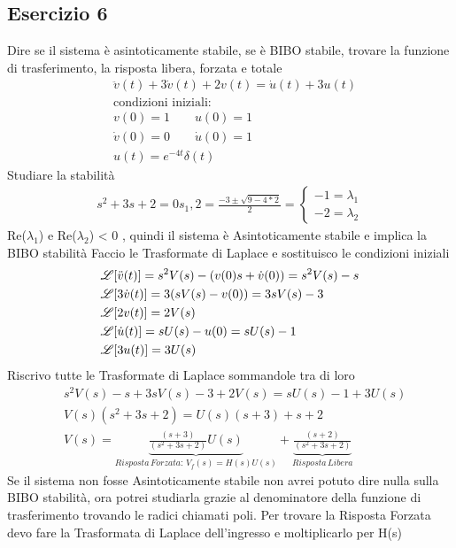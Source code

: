 	\subsection{Esercizio 6}
		Dire se il sistema è asintoticamente stabile, se è BIBO stabile, trovare la funzione di trasferimento, la risposta libera, forzata e totale
		\[
		\begin{split}
		&\ddot{v}(t)+3\dot{v}(t)+2v(t)=\dot{u}(t)+3u(t)\\
		&\mathrm{condizioni \,\, iniziali:}\\
		&v(0) = 1 \qquad u(0)=1\\
		&\dot{v}(0)=0 \qquad \dot{u}(0)=1\\
		&u(t)=e^{-4t}\delta(t)
		\end{split}
		\]
		Studiare la stabilità
		\[
		\begin{split}
		s^2+3s+2=0
		s_1,2=\frac{-3\pm\sqrt{9-4*2}}{2} = 
		\begin{cases}
		-1 = \lambda_1\\
		-2 = \lambda_2
		\end{cases} 
		\end{split}
		\]
		Re($\lambda_1$) e Re($\lambda_2$) < 0 , quindi il sistema è Asintoticamente stabile e implica la BIBO stabilità
		Faccio le Trasformate di Laplace e sostituisco le condizioni iniziali
		\[
		\begin{split}
		&\mathscr{L}[\ddot{v}(t)]=s^2V(s)-(v(0)s+\dot{v}(0)) = s^2V(s)-s\\
		&\mathscr{L}[3\dot{v}(t)]=3(sV(s)-v(0))=3sV(s)-3\\
		&\mathscr{L}[2v(t)]=2V(s)\\
		&\mathscr{L}[\dot{u}(t)]=sU(s)-u(0)=sU(s)-1\\
		&\mathscr{L}[3u(t)]=3U(s)
		\end{split}
		\]
		Riscrivo tutte le Trasformate di Laplace sommandole tra di loro
		\[
		\begin{split}
		&s^2V(s)-s+3sV(s)-3+2V(s)=sU(s)-1+3U(s)\\
		&V(s)(s^2+3s+2) = U(s)(s+3)+s+2\\
		&V(s)=\underbrace{\frac{(s+3)}{(s^2+3s+2)}U(s)}_{Risposta\,Forzata:\, V_f(s)=H(s)U(s)}+\underbrace{\frac{(s+2)}{(s^2+3s+2)}}_{Risposta\, Libera}
		\end{split}
		\]
		Se il sistema non fosse Asintoticamente stabile non avrei potuto dire nulla sulla BIBO stabilità, ora potrei studiarla grazie al denominatore della funzione di trasferimento trovando le radici chiamati poli.
		Per trovare la Risposta Forzata devo fare la Trasformata di Laplace dell'ingresso e moltiplicarlo per H(s)
